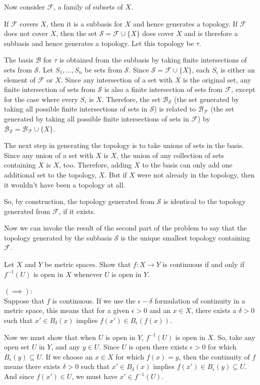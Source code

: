\documentclass{homework}
\newcommand{\calB}{\mathcal{B}}
\newcommand{\calF}{\mathcal{F}}
\newcommand{\calS}{\mathcal{S}}
\newcommand{\ra}{\ensuremath{\rightarrow}}
\begin{document}
Now consider $\calF$, a family of subsets of $X$.

If $\calF$ covers $X$, then it is a subbasis for $X$ and hence generates a
topology.  If $\calF$ does not cover $X$, then the set $\calS=\calF\cup\{X\}$
does cover $X$ and is therefore a subbasis and hence generates a topology.
Let this topology be $\tau$.

The basis $\calB$ for $\tau$ is obtained from the subbasis by taking finite
intersections of sets from $\calS$.  Let $S_1,\ldots,S_n$ be sets from $\calS$.
Since $\calS=\calF\cup\{X\}$, each $S_i$ is either an element of $\calF$ or
$X$.  Since any intersection of a set with $X$ is the original set, any finite
intersection of sets from $\calS$ is also a finite intersection of sets
from $\calF$, except for the case where every $S_i$ is $X$.  Therefore, the
set $\calB_\calS$ (the set generated by taking all possible finite intersections
of sets in $\calS$) is related to $\calB_\calF$ (the set generated by taking all
possible finite intersections of sets in $\calF$) by
$\calB_\calS=\calB_\calF\cup\{X\}$.

The next step in generating the topology is to take unions of sets in the basis.
Since any union of a set with $X$ is $X$, the union of any collection of sets
containing $X$ is $X$, too.  Therefore, adding $X$ to the basis can only add
one additional set to the topology, $X$.  But if $X$ were not already in the
topology, then it wouldn't have been a topology at all.

So, by construction, the topology generated from $\calS$ is identical to
the topology generated from $\calF$, if it exists.

Now we can invoke the result of the second part of the problem to say that
the topology generated by the subbasis $\calS$ is the unique smallest topology
containing $\calF$.

\hrulefill
\begin{exercise}{5}
Let $X$ and $Y$ be metric spaces.  Show that $f:X\ra Y$ is continuous
if and only if $f^{-1}(U)$ is open in $X$ whenever $U$ is open in $Y$.
\end{exercise}
\solution
$(\implies)$:\\
Suppose that $f$ is continuous.
If we use the $\epsilon-\delta$ formulation of continuity in a metric
space, this means that for a given $\epsilon>0$ and an $x\in X$, there
exists a $\delta>0$ such that $x'\in B_\delta(x)$ implies
$f(x')\in B_\epsilon(f(x))$.

Now we must show that when $U$ is open in $Y$, $f^{-1}(U)$ is open in $X$.
So, take any open set $U$ in $Y$, and any $y\in U$.  Since $U$ is open
there exists $\epsilon>0$ for which $B_\epsilon(y)\subseteq U$.  If we
choose an $x\in X$ for which $f(x)=y$, then the continuity of $f$ means
there exists $\delta>0$ such that $x'\in B_\delta(x)$ implies
$f(x')\in B_\epsilon(y)\subseteq U$.  And since $f(x')\in U$, we must have
$x'\in f^{-1}(U)$.
\end{document}
